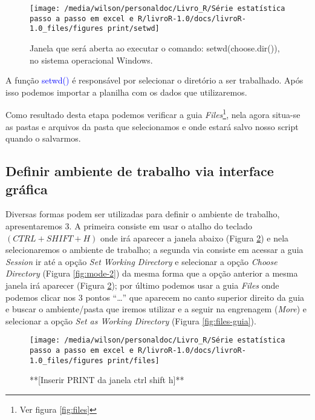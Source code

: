 \documentclass[titlepage, oneside, openany, a4paper]{book}
\begin{document}
\begin{figure}

{\centering \texttt{[image: /media/wilson/personaldoc/Livro\_R/Série estatística passo a passo em excel e R/livroR-1.0/docs/livroR-1.0\_files/figures print/setwd]} 

}

\caption{Janela que será aberta ao executar o comando: setwd(choose.dir()), no sistema operacional Windows.}\label{fig:setwd}
\end{figure}

A função \textcolor{blue}{setwd()} é responsável por selecionar o diretório a ser trabalhado. Após isso podemos importar a planilha com os dados que utilizaremos.

Como resultado desta etapa podemos verificar a guia \emph{Files}\footnote{Ver figura \ref{fig:files}}, nela agora situa-se as pastas e arquivos da pasta que selecionamos e onde estará salvo nosso script quando o salvarmos.

\hypertarget{definir-ambiente-de-trabalho-via-interface-gruxe1fica}{%
\subsection{Definir ambiente de trabalho via interface gráfica}\label{definir-ambiente-de-trabalho-via-interface-gruxe1fica}}

Diversas formas podem ser utilizadas para definir o ambiente de trabalho, apresentaremos 3. A primeira consiste em usar o atalho do teclado \((CTRL + SHIFT + H)\) onde irá aparecer a janela abaixo (Figura \ref{fig:ctrl-shift-h}) e nela selecionaremos o ambiente de trabalho; a segunda via consiste em acessar a guia \emph{Session} ir até a opção \emph{Set Working Directory} e selecionar a opção \emph{Choose Directory} (Figura \ref{fig:mode-2}) da mesma forma que a opção anterior a mesma janela irá aparecer (Figura \ref{fig:ctrl-shift-h}); por último podemos usar a guia \emph{Files} onde podemos clicar nos 3 pontos ``\ldots{}'' que aparecem no canto superior direito da guia e buscar o ambiente/pasta que iremos utilizar e a seguir na engrenagem (\emph{More}) e selecionar a opção \emph{Set as Working Directory} (Figura \ref{fig:files-guia}).

\begin{figure}

{\centering \texttt{[image: /media/wilson/personaldoc/Livro\_R/Série estatística passo a passo em excel e R/livroR-1.0/docs/livroR-1.0\_files/figures print/files]} 

}

\caption{**[Inserir PRINT da janela ctrl shift h]**}\label{fig:ctrl-shift-h}
\end{figure}
\end{document}
